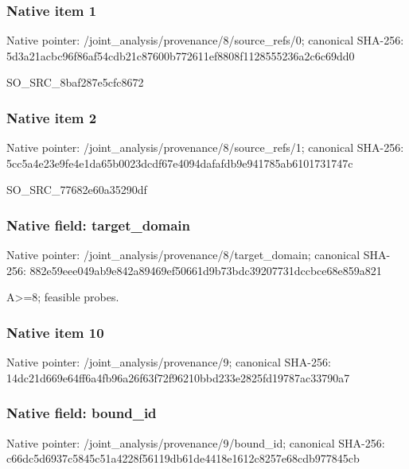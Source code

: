 \documentclass[10pt,a4paper]{article}
\begin{document}
\subsubsection{Native item 1}
Native pointer: /joint\_\allowbreak{}analysis/provenance/8/source\_\allowbreak{}refs/0; canonical SHA-256: 5d3a21acbc96f86af54cdb21c87600b772611ef8808f1128555236a2c6c69dd0

\begingroup\raggedright\sloppy SO\_\allowbreak{}SRC\_\allowbreak{}8baf287e5cfc8672\par\endgroup

\subsubsection{Native item 2}
Native pointer: /joint\_\allowbreak{}analysis/provenance/8/source\_\allowbreak{}refs/1; canonical SHA-256: 5cc5a4e23e9fe4e1da65b0023dcdf67e4094dafafdb9e941785ab6101731747c

\begingroup\raggedright\sloppy SO\_\allowbreak{}SRC\_\allowbreak{}77682e60a35290df\par\endgroup

\subsubsection{Native field: target\_\allowbreak{}domain}
Native pointer: /joint\_\allowbreak{}analysis/provenance/8/target\_\allowbreak{}domain; canonical SHA-256: 882e59eee049ab9e842a89469ef50661d9b73bdc39207731dccbce68e859a821

\begingroup\raggedright\sloppy A>=\allowbreak{}8;\allowbreak{} feasible probes.\par\endgroup

\subsubsection{Native item 10}
Native pointer: /joint\_\allowbreak{}analysis/provenance/9; canonical SHA-256: 14dc21d669e64ff6a4fb96a26f63f72f96210bbd233e2825fd19787ac33790a7

\subsubsection{Native field: bound\_\allowbreak{}id}
Native pointer: /joint\_\allowbreak{}analysis/provenance/9/bound\_\allowbreak{}id; canonical SHA-256: c66dc5d6937c5845c51a4228f56119db61de4418e1612c8257e68cdb977845cb
\end{document}
